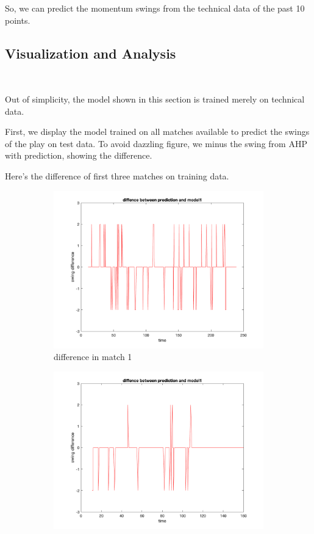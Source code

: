 So, we can predict the momentum swings from the technical data of the past 10 points.

\subsection{Visualization and Analysis}~{}

Out of simplicity, the model shown in this section is trained merely on technical data.

First, we display the model trained on all matches available to 
predict the swings of the play on test data.
To avoid dazzling figure, we minus the swing from AHP with prediction, showing the difference.

Here's the difference of first three matches on training data.

\begin{figure}[H]
    \centering
    \begin{subfigure}[b]{0.34\textwidth}
        \includegraphics[width=\linewidth]{mainmatter/imgs/swing_diff_match1_overfit.png}
        \caption{difference in match 1}
    \end{subfigure}\hspace{-0.02\textwidth}
    \begin{subfigure}[b]{0.34\textwidth}
        \includegraphics[width=\linewidth]{mainmatter/imgs/swing_diff_match2_overfit.png}

\end{subfigure}
\end{figure}
